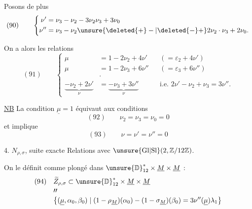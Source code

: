 
Posons de plus
\[
(90)\qquad
\left\{\begin{aligned}
\nu'&=\nu_3-\nu_2-3\nu_2\nu_3+3\nu_0\\
\nu''&=\nu_3-\nu_2\unsure{\deleted{+}-|\deleted{-}+}2\nu_2\cdot\nu_3+2\nu_0.
\end{aligned}\right.
\]

On a alors les relations
\[
(91)\qquad
\left\{\begin{aligned}
\mu&=1-2\nu_2+4\nu'&&({}=\varepsilon_2+4\nu')\\
\mu&=1-2\nu_3+6\nu''&&({}=\varepsilon_3+6\nu'')\\[6pt]
&\cdot\\[-3pt]
\underbrace{-\nu_2+2\nu'}_{\nu}&=
\underbrace{-\nu_3+3\nu''}_{\nu}
&&\text{i.e. }2\nu'-\nu_2+\nu_3=3\nu''.
\end{aligned}\right.
\]

\uline{NB} La condition $\underline\mu=1$ équivaut aux conditions
\[
(92)\qquad \nu_2=\nu_3=\nu_0=0
\]
et implique
\[
(93)\qquad \nu=\nu'=\nu''=0
\]


4. 
$N_{\rho,\sigma}$, 
suite exacte
Relations avec $\unsure{\mathrm{Gl}|\mathrm{Sl}}(2,\mathbb Z/12\mathbb Z)$.

On le définit comme plongé dans
$\unsure{\mathbb D}_{12}^{*}\times\underline M\times\underline M$ :
\[
\begin{aligned}
(94)\quad&\widetilde Z_{\rho,\sigma}
\subset \unsure{\mathbb D}_{12}^{*}\times\underline M\times\underline M\\[-2pt]
&\prime\prime\\[-2pt]
&\bigl\{(\underline\mu,\alpha_0,\beta_0)\mid
(1-\rho_{\underline M})(\alpha_0)-(1-\sigma_{\underline M})(\beta_0)
=3\nu''(\underline\mu)\lambda_1\bigr\}
\end{aligned}
\]

